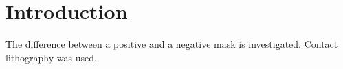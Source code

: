 \section*{Introduction}
The difference between a positive and a negative mask is investigated. Contact lithography was used.